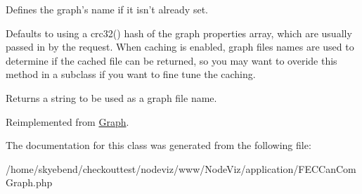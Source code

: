 Defines the graph's name if it isn't already set. 

Defaults to using a crc32() hash of the graph properties array, which are usually passed in by the request. When caching is enabled, graph files names are used to determine if the cached file can be returned, so you may want to overide this method in a subclass if you want to fine tune the caching. \begin{DoxyReturn}{Returns}
a string to be used as a graph file name. 
\end{DoxyReturn}


Reimplemented from \hyperlink{classGraph_ae31fe01b00d373a1d022286a53f150a2}{Graph}.



The documentation for this class was generated from the following file:\begin{DoxyCompactItemize}
\item 
/home/skyebend/checkouttest/nodeviz/www/NodeViz/application/FECCanComGraph.php\end{DoxyCompactItemize}
